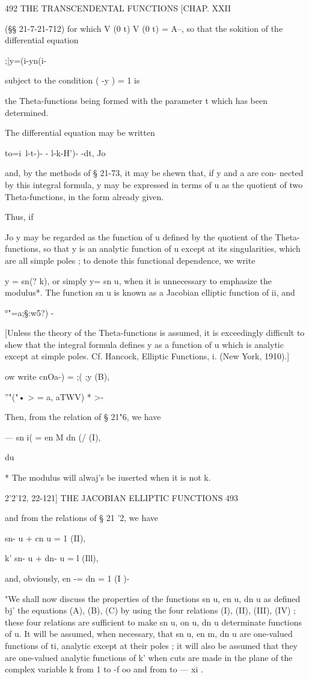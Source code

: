 492 THE TRANSCENDENTAL FUNCTIONS [CHAP. XXII

(§§ 21-7-21-712) for which V (0 t) V (0 t) = A--, so that the sokition
of the differential equation

;|y=(i-yn(i-%

subject to the condition ( -y ) = 1 is

the Theta-functions being formed with the parameter t which has been
determined.

The differential equation may be written

to=i\ l-t-)- - l-k-H')- -dt, Jo

and, by the methods of § 21-73, it may be shewn that, if y and a are
con- nected by this integral formula, y may be expressed in terms of u
as the quotient of two Theta-functions, in the form already given.

Thus, if

Jo y may be regarded as the function of u defined by the quotient of
the Theta- functions, so that y is an analytic function of u except at
its singularities, which are all simple poles ; to denote this
functional dependence, we write

y = sn(? k), or simply y= sn u, when it is unnecessary to emphasize
the modulus*. The function sn u is known as a Jacobian elliptic
function of ii, and

 °"=a;§:w5?) -

[Unless the theory of the Theta-functions is assumed, it is
exceedingly difficult to shew that the integral formula defines y as a
function of u which is analytic except at simple poles. Cf. Hancock,
Elliptic Functions, i. (New York, 1910).]

 ow write cnOa-) = ;( ;y (B),

''"("• > = a, aTWV) * >-

Then, from the relation of § 21"6, we have

 — sn i( = en M dn (/ (I),

du

* The modulus will alwaj's be iuserted when it is not k.

2'2'12, 22-121] THE JACOBIAN ELLIPTIC FUNCTIONS 493

and from the relations of § 21 '2, we have

sn- u + cn u = 1 (II),

k' sn- u + dn- u = l (Ill),

and, obviously, en -= dn = 1 (I )-

"We shall now discuss the properties of the functions sn u, en u, dn u
as defined bj' the equations (A), (B), (C) by using the four relations
(I), (II), (III), (IV) ; these four relations are sufficient to make
sn u, on u, dn u determinate functions of u. It will be assumed, when
necessary, that sn u, en m, dn u are one-valued functions of ti,
analytic except at their poles ; it will also be assumed that they are
one-valued analytic functions of k' when cuts are made in the plane of
the complex variable k from 1 to -f oo and from to — xi .

